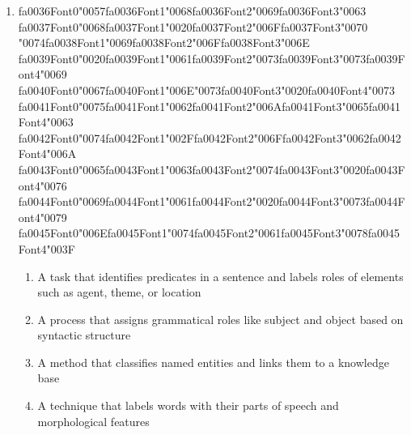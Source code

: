\documentclass[12pt]{article}
\begin{document}
\begin{enumerate}[label=Q\arabic*.]
\item {\csname fa0036Font0\endcsname\char"0057}{\csname fa0036Font1\endcsname\char"0068}{\csname fa0036Font2\endcsname\char"0069}{\csname fa0036Font3\endcsname\char"0063} {\csname fa0037Font0\endcsname\char"0068}{\csname fa0037Font1\endcsname\char"0020}{\csname fa0037Font2\endcsname\char"006F}{\csname fa0037Font3\endcsname\char"0070} {\char"0074}{\csname fa0038Font1\endcsname\char"0069}{\csname fa0038Font2\endcsname\char"006F}{\csname fa0038Font3\endcsname\char"006E} {\csname fa0039Font0\endcsname\char"0020}{\csname fa0039Font1\endcsname\char"0061}{\csname fa0039Font2\endcsname\char"0073}{\csname fa0039Font3\endcsname\char"0073}{\csname fa0039Font4\endcsname\char"0069} {\csname fa0040Font0\endcsname\char"0067}{\csname fa0040Font1\endcsname\char"006E}{\char"0073}{\csname fa0040Font3\endcsname\char"0020}{\csname fa0040Font4\endcsname\char"0073} {\csname fa0041Font0\endcsname\char"0075}{\csname fa0041Font1\endcsname\char"0062}{\csname fa0041Font2\endcsname\char"006A}{\csname fa0041Font3\endcsname\char"0065}{\csname fa0041Font4\endcsname\char"0063} {\csname fa0042Font0\endcsname\char"0074}{\csname fa0042Font1\endcsname\char"002F}{\csname fa0042Font2\endcsname\char"006F}{\csname fa0042Font3\endcsname\char"0062}{\csname fa0042Font4\endcsname\char"006A} {\csname fa0043Font0\endcsname\char"0065}{\csname fa0043Font1\endcsname\char"0063}{\csname fa0043Font2\endcsname\char"0074}{\csname fa0043Font3\endcsname\char"0020}{\csname fa0043Font4\endcsname\char"0076} {\csname fa0044Font0\endcsname\char"0069}{\csname fa0044Font1\endcsname\char"0061}{\csname fa0044Font2\endcsname\char"0020}{\csname fa0044Font3\endcsname\char"0073}{\csname fa0044Font4\endcsname\char"0079} {\csname fa0045Font0\endcsname\char"006E}{\csname fa0045Font1\endcsname\char"0074}{\csname fa0045Font2\endcsname\char"0061}{\csname fa0045Font3\endcsname\char"0078}{\csname fa0045Font4\endcsname\char"003F}
\begin{enumerate}[label=(\Alph*)]
    \item A task that identifies predicates in a sentence and labels roles of elements such as agent, theme, or location
    \item A process that assigns grammatical roles like subject and object based on syntactic structure
    \item A method that classifies named entities and links them to a knowledge base
    \item A technique that labels words with their parts of speech and morphological features 
\end{enumerate}

\end{enumerate}
\end{document}
